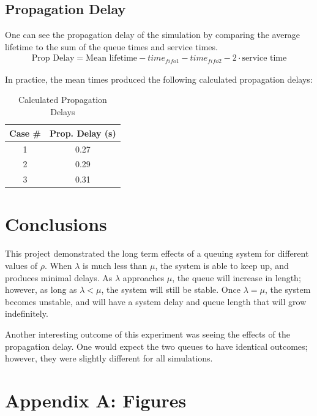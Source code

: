\documentclass{article}
\begin{document}
\subsection*{Propagation Delay}
One can see the propagation delay of the simulation by comparing the average lifetime to the sum of the queue times and service times.
\begin{align*}
\text{Prop Delay} = \text{Mean lifetime} - time_{fifo1} - time_{fifo2} - 2 \cdot \text{service time}
\end{align*}

In practice, the mean times produced the following calculated propagation delays:

\begin{table}[h!]
\centering
\begin{tabular}{|c|c|} \hline
\textbf{Case \#} & \textbf{Prop. Delay (s)} \\ \hline
1 & 0.27 \\ \hline
2 & 0.29 \\ \hline
3 & 0.31 \\ \hline
\end{tabular}
\caption{Calculated Propagation Delays}
\label{tab:calcPropDelay}
\end{table}


\section*{Conclusions}
This project demonstrated the long term effects of a queuing system for different values of $\rho$.  
When $\lambda$ is much less than $\mu$, the system is able to keep up, and produces minimal delays.  
As $\lambda$ approaches $\mu$, the queue will increase in length; however, as long as $\lambda < \mu$, the system will still be stable.
Once $\lambda = \mu$, the system becomes unstable, and will have a system delay and queue length that will grow indefinitely.

Another interesting outcome of this experiment was seeing the effects of the propagation delay.  One would expect the two queues to have identical outcomes; however, they were slightly different for all simulations.


\newpage
\section*{Appendix A:  Figures}
\end{document}
